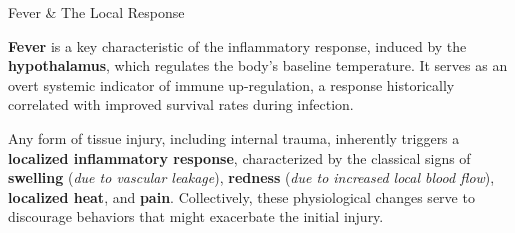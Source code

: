     \begin{core}{Fever \& The Local Response}

      \textbf{Fever} is a key characteristic of the inflammatory response, induced by the \textbf{hypothalamus}, which regulates the body's baseline temperature. It serves as an overt systemic indicator of immune up-regulation, a response historically correlated with improved survival rates during infection.

      Any form of tissue injury, including internal trauma, inherently triggers a \textbf{localized inflammatory response}, characterized by the classical signs of \textbf{swelling} (\textit{due to vascular leakage}), \textbf{redness} (\textit{due to increased local blood flow}), \textbf{localized heat}, and \textbf{pain}. Collectively, these physiological changes serve to discourage behaviors that might exacerbate the initial injury.


    \end{core}

